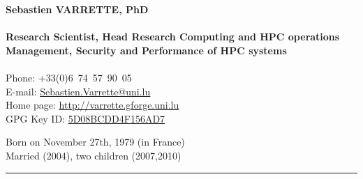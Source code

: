 \documentclass{cv}
\begin{document}
\begin{chapeau}
  \begin{adresse}
    {\Large\textbf{Sebastien VARRETTE, PhD}}\\
    \ligne\\
    \textbf{Research Scientist, Head Research Computing and HPC operations}\\
    \textbf{Management, Security and Performance of HPC systems}\\
    \ligne\\
    Phone: +33(0)6~74~57~90~05\\
    E-mail:    \url{Sebastien.Varrette@uni.lu}\\
    Home page: \url{http://varrette.gforge.uni.lu}\\
    GPG Key ID: \href{https://pgp.mit.edu/pks/lookup?op=vindex&search=0x5D08BCDD4F156AD7}{5D08BCDD4F156AD7}
  \end{adresse}
  \begin{etatcivil}

    Born on November 27th, 1979 (in France)\\
    Married (2004), two children (2007,2010)\\
  \end{etatcivil}
\end{chapeau}
\vspace*{0.5em}
\noindent\rule{\textwidth}{0.4pt}
\end{document}

